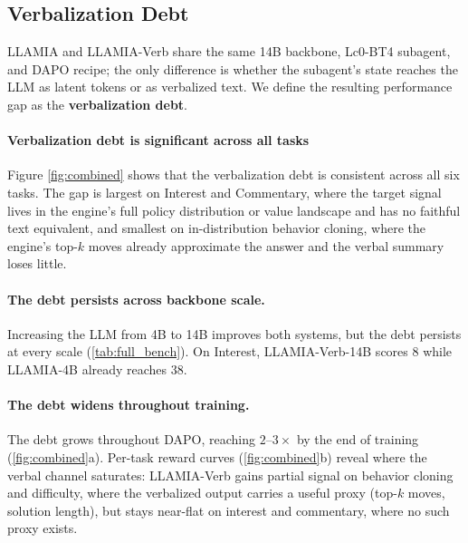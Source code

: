 \subsection{Verbalization Debt}
\label{sec:results_vd}

LLAMIA and LLAMIA-Verb share the same 14B backbone, Lc0-BT4 subagent, and DAPO recipe; the only difference is whether the subagent's state reaches the LLM as latent tokens or as verbalized text. We define the resulting performance gap as the \textbf{verbalization debt}.

\paragraph{Verbalization debt is significant across all tasks}
Figure \ref{fig:combined} shows that the verbalization debt is consistent across all six tasks. The gap is largest on Interest and Commentary, where the target signal lives in the engine's full policy distribution or value landscape and has no faithful text equivalent, and smallest on in-distribution behavior cloning, where the engine's top-$k$ moves already approximate the answer and the verbal summary loses little.

\paragraph{The debt persists across backbone scale.}
Increasing the LLM from 4B to 14B improves both systems, but the debt persists at every scale (\cref{tab:full_bench}). On Interest, LLAMIA-Verb-14B scores $8$ while LLAMIA-4B already reaches $38$.

\paragraph{The debt widens throughout training.}
The debt grows throughout DAPO, reaching $2$--$3\times$ by the end of training (\cref{fig:combined}a). Per-task reward curves (\cref{fig:combined}b) reveal where the verbal channel saturates: LLAMIA-Verb gains partial signal on behavior cloning and difficulty, where the verbalized output carries a useful proxy (top-$k$ moves, solution length), but stays near-flat on interest and commentary, where no such proxy exists.

